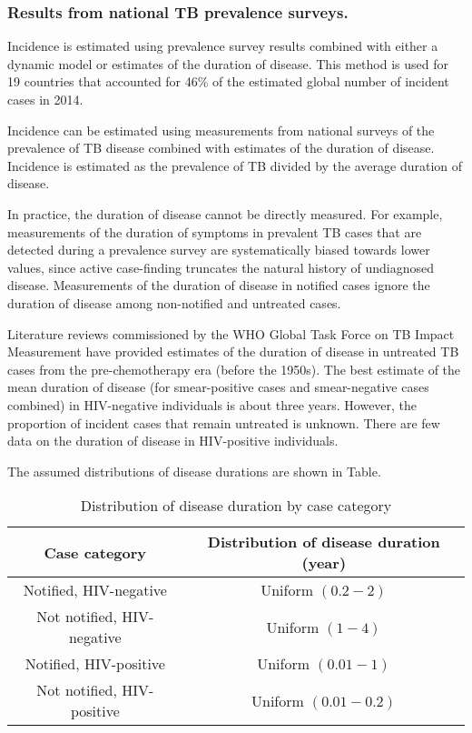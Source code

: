 \subsubsection {Results from national TB prevalence surveys.} Incidence is estimated using prevalence survey results combined with either a dynamic model or estimates of the duration of disease. This method is used for 19 countries that accounted for 46\% of the estimated global number of incident cases in 2014.

Incidence can be estimated using measurements from national surveys of the prevalence of TB disease combined with estimates of the duration of disease. Incidence is estimated as the prevalence of TB divided by the average duration of disease. 

In practice, the duration of disease cannot be directly measured. For example, measurements of the duration of symptoms in prevalent TB cases that are detected during a prevalence survey are systematically biased towards lower values, since active case-finding truncates the natural history of undiagnosed disease. Measurements of the duration of disease in notified cases ignore the duration of disease among non-notified and untreated cases. 

Literature reviews commissioned by the WHO Global Task Force on TB Impact Measurement have provided estimates of the duration of disease in untreated TB cases from the pre-chemotherapy era (before the 1950s). The best estimate of the mean duration of disease (for smear-positive cases and smear-negative cases combined) in HIV-negative individuals is about three years. However, the proportion of incident cases that remain untreated is unknown. There are few data on the duration of disease in HIV-positive individuals. 

The assumed distributions of disease durations are shown in Table.

\begin{table} 
    \begin{tabular}{ c c }
        \hline
        Case category & Distribution of disease duration (year) \\ 
        \hline
        Notified, HIV-negative & Uniform $(0.2 - 2)$ \\ 
        Not notified, HIV-negative & Uniform $(1 - 4)$ \\ 
        Notified, HIV-positive & Uniform $(0.01 - 1)$ \\ 
        Not notified, HIV-positive & Uniform $(0.01 - 0.2)$ \\ 
        \hline
    \end{tabular} 
    \caption{Distribution of disease duration by case category} 
\end{table}

